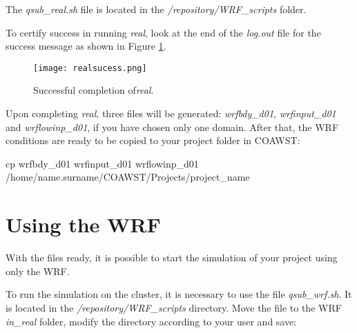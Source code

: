 \begin{tcolorbox}[enhanced,
  grow to left by=0cm,%
  grow to right by=0cm,%
  enlarge top by=0cm,%
  enlarge bottom by=0cm,%
  tcbox raise base,
  boxrule=1.0pt,
  left=18mm,
  colframe=red!50!black,coltext=red!25!black,colback=red!10!white,
  overlay={\begin{tcbclipinterior}\fill[red!75!blue!50!white] (frame.south west)
    rectangle node[text=white,font=\sffamily\bfseries\footnotesize,rotate=0] {WARNING} ([xshift=18mm]frame.north west);\end{tcbclipinterior}}]
The \textit{qsub\_real.sh} file is located in the \textit{/repository/WRF\_scripts} folder.
\end{tcolorbox}
\bigskip

\noindent To certify success in running \textit{real}, look at the end of the \textit{log.out} file for the success message as shown 
in Figure \textcolor{bleu_cite}{\ref{realfinish}}.
\bigskip

\begin{figure}[H]
    \centering
    \texttt{[image: realsucess.png]}
    \caption{Successful completion of\textit{real}.}
    \label{realfinish}
\end{figure}
\bigskip


\noindent Upon completing \textit{real}, three files will be generated: \textit{wrfbdy\_d01}, \textit{wrfinput\_d01} and 
\textit{wrflowinp\_d01}, if you have chosen only one domain. After that, the WRF conditions are ready to be copied to your project
folder in COAWST:
\bigskip

\begin{bashcode}[fontsize=\scriptsize]
cp wrfbdy_d01 wrfinput_d01 wrflowinp_d01 /home/name.surname/COAWST/Projects/project_name
\end{bashcode}
\bigskip

\section{Using the WRF}\label{wrfsecao2}
\bigskip

\noindent With the files ready, it is possible to start the simulation of your project using only the WRF.
\bigskip

\noindent To run the simulation on the cluster, it is necessary to use the file \textit{qsub\_wrf.sh}. It is located in the 
\textit{/repository/WRF\_scripts} directory. Move the file to the WRF \textit{in\_real} folder, modify the directory according
to your user and save:
\bigskip

